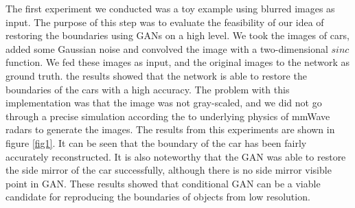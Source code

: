 The first experiment we conducted was a toy example using blurred images as input. The purpose of this step was to evaluate the feasibility of our idea of restoring the boundaries using GANs on a high level. We took the images of cars, added some Gaussian noise and convolved the image with a two-dimensional $sinc$ function. We fed these images as input, and the original images to the network as ground truth. the results showed that the network is able to restore the boundaries of the cars with a high accuracy. The problem with this implementation was that the image was not gray-scaled, and we did not go through a precise simulation according the to underlying physics of mmWave radars to generate the images. The results from this experiments are shown in figure \ref{fig1}. It can be seen that the boundary of the car has been fairly accurately reconstructed. It is also noteworthy that the GAN was able to restore the side mirror of the car successfully, although there is no side mirror visible point in GAN. These results showed that conditional GAN can be a viable candidate for reproducing the boundaries of objects from low resolution. 


